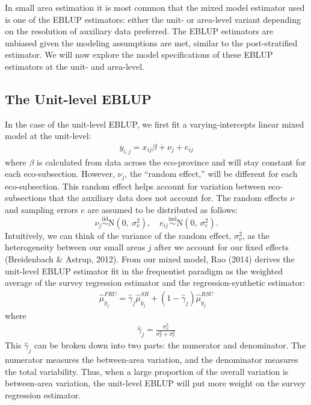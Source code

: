 \documentclass[12pt,twoside]{reedthesis}
\begin{document}
In small area estimation it is most common that the mixed model estimator used is one of the EBLUP estimators: either the unit- or area-level variant depending on the resolution of auxiliary data preferred. The EBLUP estimators are unbiased given the modeling assumptions are met, similar to the post-stratified estimator. We will now explore the model specifications of these EBLUP estimators at the unit- and area-level.

\hypertarget{the-unit-level-eblup}{%
\subsection{The Unit-level EBLUP}\label{the-unit-level-eblup}}

In the case of the unit-level EBLUP, we first fit a varying-intercepts linear mixed model at the unit-level:
\begin{align}
y_{i,j} = x_{ij} \beta + \nu_j + e_{ij} \label{eq:unit-mod}
\end{align}
where \(\beta\) is calculated from data across the eco-province and will stay constant for each eco-subsection. However, \(\nu_j\), the ``random effect,'' will be different for each eco-subsection. This random effect helps account for variation between eco-subsections that the auxiliary data does not account for. The random effects \(\nu\) and sampling errors \(e\) are assumed to be distributed as follows:
\[
 \newcommand\myeq{\stackrel{\mathclap{\normalfont\mbox{s}}}{~}}
\nu_j \stackrel{\text{iid}}{\sim} \text{N}(0,~ \sigma^2_{\nu}), \quad
e_{ij} \stackrel{\text{ind}}{\sim}\text{N}(0,~\sigma^2_e).
\]
Intuitively, we can think of the variance of the random effect, \(\sigma^2_\nu\), as the heterogeneity between our small areas \(j\) after we account for our fixed effects (Breidenbach \& Astrup, 2012). From our mixed model, Rao (2014) derives the unit-level EBLUP estimator fit in the frequentist paradigm as the weighted average of the survey regression estimator and the regression-synthetic estimator:
\begin{align}
\hat \mu_{y_j}^{FRU} = \hat \gamma_j \hat\mu_{y_j}^{SR} + (1 - \hat \gamma_j) \hat\mu_{y_j}^{RSU}
\end{align}
where
\begin{align}
\hat\gamma_j = \frac{\sigma^2_\nu}{\sigma^2_\nu + \sigma^2_e}
\end{align}
This \(\hat\gamma_j\) can be broken down into two parts: the numerator and denominator. The numerator measures the between-area variation, and the denominator measures the total variability. Thus, when a large proportion of the overall variation is between-area variation, the unit-level EBLUP will put more weight on the survey regression estimator.
\end{document}
